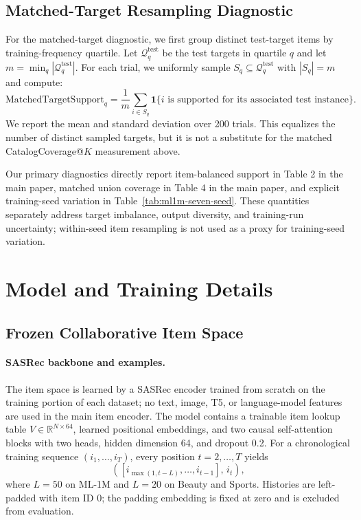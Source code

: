 \documentclass[letterpaper]{article}
\begin{document}
\subsection{Matched-Target Resampling Diagnostic}
\label{app:matched-target}

For the matched-target diagnostic, we first group distinct test-target items by training-frequency quartile. Let $\mathcal{Q}^{\mathrm{test}}_q$ be the test targets in quartile $q$ and let $m=\min_q|\mathcal{Q}^{\mathrm{test}}_q|$. For each trial, we uniformly sample $S_q\subseteq\mathcal{Q}^{\mathrm{test}}_q$ with $|S_q|=m$ and compute:
\[
\mathrm{MatchedTargetSupport}_q =
\frac{1}{m}
\sum_{i\in S_q}
\mathbf{1}\{i\text{ is supported for its associated test instance}\}.
\]
We report the mean and standard deviation over 200 trials. This equalizes the number of distinct sampled targets, but it is not a substitute for the matched CatalogCoverage@$K$ measurement above.

Our primary diagnostics directly report item-balanced support in
Table 2 in the main paper, matched union coverage in
Table 4 in the main paper, and explicit training-seed variation in
Table~\ref{tab:ml1m-seven-seed}. These quantities separately address target
imbalance, output diversity, and training-run uncertainty; within-seed item
resampling is not used as a proxy for training-seed variation.

\section{Model and Training Details}
\label{app:training}

\subsection{Frozen Collaborative Item Space}
\label{app:item-encoder}

\paragraph{SASRec backbone and examples.}
The item space is learned by a SASRec encoder trained from scratch on the
training portion of each dataset; no text, image, T5, or language-model
features are used in the main item encoder.  The model contains a trainable
item lookup table \(V\in\mathbb{R}^{N\times64}\), learned positional
embeddings, and two causal self-attention blocks with two heads, hidden
dimension 64, and dropout 0.2.  For a chronological training sequence
\((i_1,\ldots,i_T)\), every position \(t=2,\ldots,T\) yields
\[
  ([i_{\max(1,t-L)},\ldots,i_{t-1}],\,i_t),
\]
where \(L=50\) on ML-1M and \(L=20\) on Beauty and Sports.  Histories are
left-padded with item ID 0; the padding embedding is fixed at zero and is
excluded from evaluation.
\end{document}
